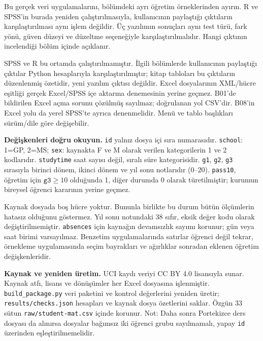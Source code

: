 Bu gerçek veri uygulamalarını, bölümdeki ayrı öğretim örneklerinden ayırın.
R ve SPSS'in burada yeniden çalıştırılmasıyla, kullanıcının paylaştığı
çıktıların karşılaştırılması aynı işlem değildir. Üç yazılımın
sonuçları aynı test türü, fark yönü, güven düzeyi ve düzeltme seçeneğiyle
karşılaştırılmalıdır. Hangi çıktının incelendiği bölüm içinde açıklanır.

\begin{mistakebox}
SPSS ve R bu ortamda çalıştırılmamıştır. İlgili bölümlerde kullanıcının
paylaştığı çıktılar Python hesaplarıyla karşılaştırılmıştır; kitap tabloları
bu çıktıların düzenlenmiş özetidir, yeni yazılım çıktısı değildir.
Excel dosyalarının XML/hücre eşitliği gerçek Excel/SPSS içe aktarma
denemesinin yerine geçmez. B01'de bildirilen Excel açma sorunu çözülmüş
sayılmaz; doğrulanan yol CSV'dir. B08'in Excel yolu da yerel SPSS'te
ayrıca denenmelidir. Menü ve tablo başlıkları sürüm/dile göre değişebilir.
\end{mistakebox}

\textbf{Değişkenleri doğru okuyun.} \texttt{id} yalnız dosya içi sıra
numarasıdır. \texttt{school}: 1=GP, 2=MS;
\texttt{sex}: kaynakta F ve M olarak verilen kategorilerin 1 ve 2 kodlarıdır.
\texttt{studytime} saat sayısı değil, sıralı süre kategorisidir.
\texttt{g1}, \texttt{g2}, \texttt{g3} sırasıyla birinci dönem, ikinci dönem ve
yıl sonu notlarıdır (0--20). \texttt{pass10}, öğretim için
$\texttt{g3}\geq10$ olduğunda 1, diğer durumda 0 olarak türetilmiştir;
kurumun bireysel öğrenci kararının yerine geçmez.

Kaynak dosyada boş hücre yoktur. Bununla birlikte bu durum bütün ölçümlerin
hatasız olduğunu göstermez. Yıl sonu notundaki 38 sıfır, eksik değer kodu
olarak değiştirilmemiştir. \texttt{absences} için kaynağın devamsızlık sayımı
korunur; gün veya saat birimi varsayılmaz. Benzetim uygulamalarında satırlar
öğrenci değil tekrar, örnekleme uygulamasında seçim bayrakları ve ağırlıklar
sonradan eklenen öğretim değişkenleridir.

\textbf{Kaynak ve yeniden üretim.} UCI kaydı veriyi CC BY 4.0 lisansıyla
sunar. Kaynak atfı, lisans ve dönüşümler her Excel dosyasına işlenmiştir.
\texttt{build\_package.py} veri paketini ve kontrol değerlerini yeniden
üretir; \texttt{results/checks.json} hesapları ve kaynak dosya özetlerini
saklar. Özgün 33 sütun \texttt{raw/student-mat.csv} içinde korunur.
Not: Daha sonra Portekizce ders dosyası da alınırsa dosyalar bağımsız iki
öğrenci grubu sayılmamalı, yapay \texttt{id} üzerinden eşleştirilmemelidir.